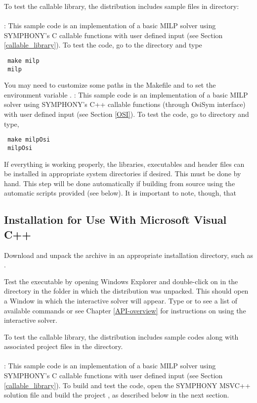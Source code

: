 To test the callable library, the distribution
includes sample files in  directory:  \\ \\
: This sample code is an implementation of a basic MILP
solver using SYMPHONY's C callable functions with user defined input (see
Section \ref{callable_library}). To test the code, go to the
 directory and type 
{\color{brown}
\begin{verbatim}
 make milp 
 milp
\end{verbatim}
}
You may need to customize some paths in the Makefile and to set the
environment variable . 
: This sample code is an implementation of a basic MILP 
solver using SYMPHONY's C++ callable functions (through OsiSym interface)
with user defined input (see Section \ref{OSI}). To test the code, 
go to  directory and type, 
{\color{brown}
\begin{verbatim}
 make milpOsi
 milpOsi
\end{verbatim}
}

If everything is working properly, the libraries, executables and header files
can be installed in appropriate system directories if desired. This must be
done by hand. This step will be done automatically if building from source
using the automatic scripts provided (see below). It is important to note,
though, that 


\subsection{Installation for Use With Microsoft Visual C++}

Download and unpack the archive  in an
appropriate installation directory, such as . 

Test the executable by opening Windows Explorer and double-click
on  in the 
directory in the folder in which the distribution was unpacked. This should
open a Window in which the interactive solver will appear. Type 
or  to see a list of available commands or see Chapter
\ref{API-overview} for instructions on using the interactive solver.

To test the callable library, the distribution includes sample codes
along with associated project files in the  directory. \\ \\
: This sample code is an implementation of a basic MILP
solver using SYMPHONY's C callable functions with user defined input (see
Section \ref{callable_library}). To build and test the code, open the SYMPHONY
MSVC++ solution file and build the project , as
described below in the next section.

